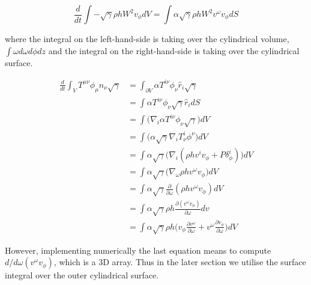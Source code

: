\begin{equation}
\frac{d}{dt}\int -\sqrt{\gamma} \rho h W^2 v_{\phi} dV = \int \alpha\sqrt{\gamma}\rho h W^2 v^{\omega}v_{\phi} dS
\end{equation}

where the integral on the left-hand-side is taking over the cylindrical volume, $\int \omega d\omega d\phi dz$ and the integral on the right-hand-side is taking over the cylindrical surface. 

\begin{align}
\frac{d}{dt}\int_{V} T^{\mu\nu}\phi_{\mu}n_{\nu}\sqrt{\gamma} &= \int_{\partial V} \alpha T^{i \nu} \phi_{\nu} \hat{r}_i\sqrt{\gamma} \\
&= \int\alpha T^{i \nu} \phi_{\nu}\sqrt{\gamma}\hat{r}_i dS \\
&= \int\Big(\nabla_i \alpha T^{i \nu} \phi_{\nu}\sqrt{\gamma} \Big) dV\\
&= \int\Big(\alpha\sqrt{\gamma}\nabla_i T^i _{\nu}\phi^{\nu}\Big) dV\\
&= \int\alpha\sqrt{\gamma}\Big(\nabla_i(\rho h v^i v_{\phi} + P\delta^i _{\phi})\Big) dV\\
&= \int\alpha\sqrt{\gamma}\Big(\nabla_{\omega}\rho h v^{\omega} v_{\phi} \Big) dV\\
&= \int\alpha\sqrt{\gamma}\frac{\partial}{\partial\omega}(\rho h v^{\omega}v_{\phi}) dV \\
&= \int\alpha\sqrt{\gamma}\rho h \frac{\partial(v^{\omega}v_{\phi})}{\partial\omega}dv \\
&= \int\alpha\sqrt{\gamma}\rho h\Big(v_{\phi}\frac{\partial v^{\omega}}{\partial\omega} + v^{\omega}\frac{\partial v_{\phi}}{\partial\omega}\Big)dV
\end{align}

However, implementing numerically the last equation means to compute $d/d\omega(v^{\omega}v_{\phi})$, which is a 3D array. Thus in the later section we utilise the surface integral over the outer cylindrical surface. 